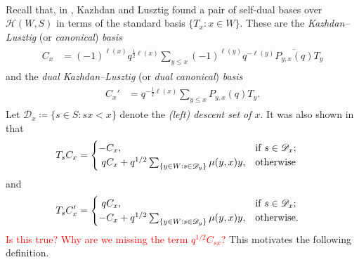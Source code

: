 \noindent\\ Recall that, in \cite{KL79}, Kazhdan and Lusztig found a pair of self-dual bases over $\mathscr{H}(W, S)$ in terms of the standard basis $\{T_x : x \in W\}$. These are the {\em Kazhdan--Lusztig} (or {\em canonical}) {\em basis}
\begin{align*}
\begin{split}
C_x &= (-1)^{\ell(x)}q^{\frac{1}{2}\ell(x)}\sum_{y \leq x} (-1)^{\ell(y)}q^{-\ell(y)}\overline{P_{y,x}(q)} T_y
\end{split}
\end{align*}
\noindent and the {\em dual Kazhdan--Lusztig} (or {\em dual canonical}) {\em basis}
\begin{align*}
\begin{split}
C_x' &= q^{-\frac{1}{2}\ell(x)}\sum_{y \leq x} P_{y,x}(q) T_y.
\end{split}
\end{align*}
\noindent Let $\mathscr{D}_x \coloneqq \{s \in S : sx < x\}$ denote the {\em (left) descent set of $x$}. It was also shown in \cite{KL79} that
\begin{align*}
\begin{split}
T_sC_x &= \begin{cases}
-C_x, &\text{if $s \in \mathscr{D}_x$;}\\
\nhphantom{$q$}\hphantom{-}qC_x + q^{1/2}\sum_{\{y \in W : s \in \mathscr{D}_y\}} \mu(y, x)y, &\text{otherwise}\hphantom{.}
\end{cases}
\end{split}
\end{align*}
\noindent and
\begin{align*}
\begin{split}
T_sC_x' &= \begin{cases}
\nhphantom{$q$}\hphantom{-}qC_x, &\text{if $s \in \mathscr{D}_x$;}\\
-C_x + q^{1/2}\sum_{\{y \in W : s \in \mathscr{D}_y\}} \mu(y, x)y, &\text{otherwise.}
\end{cases}
\end{split}
\end{align*}
\noindent \textcolor{red}{Is this true? Why are we missing the term $q^{1/2}C_{sx}$?} This motivates the following definition.\\

